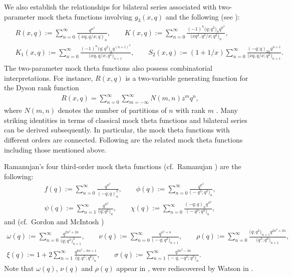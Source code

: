 \documentclass[pdftex]{sigma}
\numberwithin{equation}{section}
\begin{document}
We also establish the relationships for bilateral series associated
with two-parameter mock theta functions involving $g_3(x,q)$ and the following (see \cite{K,McI1,Mo1}):
\begin{gather*}
\begin{split}
& R(x,q):=\sum_{n=0}^{\infty}\frac{q^{n^2}}{(xq,q/x;q)_n},\qquad
K(x,q):=\sum_{n=0}^{\infty}\frac{(-1)^n\bigl(q;q^2\bigr)_nq^{n^2}}
{\bigl(xq^2,q^2/x;q^2\bigr)_n},\\
& K_1(x,q):=\sum_{n=0}^{\infty}\frac{(-1)^n\bigl(q;q^2\bigr)_nq^{(n+1)^2}} {\bigl(xq,q/x;q^2\bigr)_{n+1}},\qquad
S_2(x,q):=(1+1/x)\sum_{n=0}^{\infty}\frac{(-q;q)_{2n}q^{n+1}}
{\bigl(xq,q/x;q^2\bigr)_{n+1}}.
\end{split}
\end{gather*}
The two-parameter mock theta functions also possess combinatorial interpretations. For instance, $R(x,q)$ is a two-variable generating function for the Dyson rank function
\begin{align*}
R(x,q)=\sum_{n=0}^{\infty}\sum_{m=-\infty}^{\infty}N(m,n)z^mq^n,
\end{align*}
where $N(m,n)$ denotes the number of partitions of $n$ with rank $m$ \cite{Dyson}.
Many striking identities in terms of classical mock theta functions and bilateral series can be derived subsequently. In particular, the mock theta functions with different orders are connected. Following are the related mock theta functions including those mentioned above.

Ramanujan's four third-order mock theta functions (cf.~Ramanujan \cite{R}) are the following:
\begin{align*}
f(q):=\sum_{n=0}^{\infty}\frac{q^{n^2}}{(-q;q)_n^2},\qquad
\phi(q):=\sum_{n=0}^{\infty}\frac{q^{n^2}}{\bigl(-q^2;q^2\bigr)_n},\\
\psi(q):=\sum_{n=1}^{\infty}\frac{q^{n^2}}{\bigl(q;q^2\bigr)_n},\qquad
\chi(q):=\sum_{n=0}^{\infty}\frac{(-q;q)_nq^{n^2}}{\bigl(-q^3;q^3\bigr)_n},
\end{align*}
and (cf.\ Gordon and McIntosh \cite{GM1})
\begin{gather*}
\omega(q):=\sum_{n=0}^{\infty}\frac{q^{2n^2+2n}}{\bigl(q;q^2\bigr)_{n+1}^2},\qquad
\nu(q):=\sum_{n=0}^{\infty}\frac{q^{n^2+n}}{\bigl(-q;q^2\bigr)_{n+1}},\qquad\rho(q):=\sum_{n=0}^{\infty}\frac{\bigl(q;q^2\bigr)_{n+1}q^{2n^2+2n}}{\bigl(q^3;q^6\bigr)_{n+1}},\\
\xi(q):=1+2\sum_{n=1}^{\infty}\frac{q^{6n^2-6n+1}}{\bigl(q,q^5;q^6\bigr)_n},\qquad
\sigma(q):=\sum_{n=1}^{\infty}\frac{q^{3n^2-3n}}{\bigl(-q,-q^2;q^3\bigr)_n}.
\end{gather*}
Note that $\omega(q)$, $\nu(q)$ and $\rho(q)$ appear in \cite{R}, were rediscovered by Watson in \cite{W1}.
\end{document}
